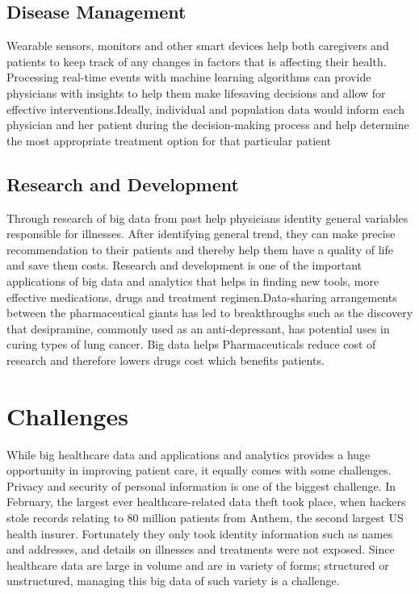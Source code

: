 \documentclass[sigconf]{acmart}
\begin{document}
\subsection{Disease Management} 
Wearable sensors, monitors and other smart devices help both caregivers and patients to keep track of any changes in factors that is affecting their health. Processing real-time events with machine learning algorithms can provide physicians with insights to help them make lifesaving decisions and allow for effective interventions\cite{www-mapr-com}.Ideally, individual and population data would inform each physician and her patient during the decision-making process and help determine the most appropriate treatment option for that particular patient\cite{www-link-springer-com}



\subsection{Research and Development}
Through research of big data from past help physicians identity general variables responsible for illnesses. After identifying general trend, they can make precise recommendation to their patients and thereby help them have a quality of life and save them costs. 
Research and development is one of the important applications of big data and
analytics that helps in finding new tools, more effective medications, drugs 
and treatment regimen.Data-sharing arrangements between the pharmaceutical giants has led to breakthroughs such as the discovery that desipramine, commonly used as an anti-depressant, has potential uses in curing types of lung cancer\cite{www-forbes-com}. Big data helps Pharmaceuticals reduce cost of research and therefore lowers drugs cost which benefits patients. 
 
 




\section{Challenges}
While big healthcare data and applications and analytics provides a huge opportunity in improving patient care, it equally comes with some challenges. 
Privacy and security of personal information is one of the biggest challenge.
In February, the largest ever healthcare-related data theft took place, when hackers stole records relating to 80 million patients 
from Anthem, the second largest US health insurer. Fortunately they only took identity information such as names and addresses, 
and details on illnesses and treatments were not exposed\cite{www-forbes-com}.
Since healthcare data are large in volume and are in variety of forms; structured or unstructured, managing this big data of such variety is a challenge. 
\end{document}
